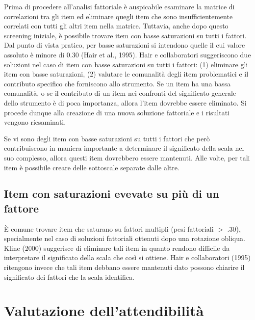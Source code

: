 Prima di procedere all'analisi fattoriale è auspicabile esaminare la matrice di correlazioni tra gli item ed eliminare quegli item che sono insufficientemente correlati con tutti gli altri item nella matrice. Tuttavia, anche dopo questo screening iniziale, è possibile trovare item con basse saturazioni su tutti i fattori. Dal punto di vista pratico, per basse saturazioni si intendono quelle il cui valore assoluto è minore di 0.30 (Hair et al., 1995). Hair e collaboratori suggeriscono due soluzioni nel caso di item con basse saturazioni su tutti i fattori: (1) eliminare gli item con basse saturazioni, (2) valutare le comunalità degli item problematici e il contributo specifico che forniscono allo strumento. Se un item ha una bassa comunalità, o se il contributo di un item nei confronti del significato generale dello strumento è di poca importanza, allora l'item dovrebbe essere eliminato.  Si procede dunque alla creazione di una nuova soluzione fattoriale e i risultati vengono riesaminati.

Se vi sono degli item con basse saturazioni su tutti i fattori che però contribuiscono in maniera importante a determinare il significato della scala nel suo complesso, allora questi item dovrebbero essere mantenuti.  Alle volte, per tali item è possibile creare delle sottoscale separate dalle altre.

\subsection{Item con saturazioni evevate su più di un fattore}

È comune trovare item che saturano su fattori multipli (pesi fattoriali $>$ .30), specialmente nel caso di soluzioni fattoriali ottenuti dopo una rotazione obliqua. 
Kline (2000) suggerisce di eliminare tali item in quanto rendono difficile da interpretare il significato della scala che così si ottiene.  Hair e collaboratori (1995) ritengono invece che tali item debbano essere mantenuti dato possono chiarire il significato dei fattori che la scala identifica. 

\section{Valutazione dell'attendibilità}

